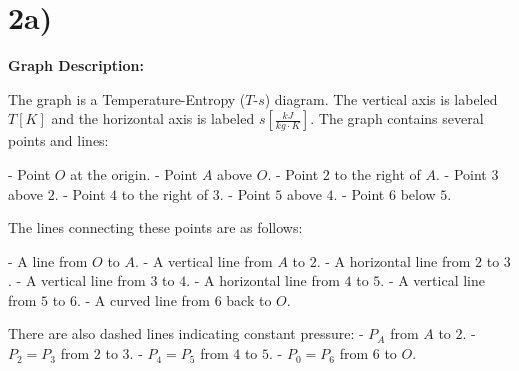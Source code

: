 

\section*{2a)}

\begin{center}
\textbf{Graph Description:}
\end{center}

The graph is a Temperature-Entropy ($T$-$s$) diagram. The vertical axis is labeled $T [K]$ and the horizontal axis is labeled $s \left[ \frac{kJ}{kg \cdot K} \right]$. The graph contains several points and lines:

- Point $O$ at the origin.
- Point $A$ above $O$.
- Point $2$ to the right of $A$.
- Point $3$ above $2$.
- Point $4$ to the right of $3$.
- Point $5$ above $4$.
- Point $6$ below $5$.

The lines connecting these points are as follows:

- A line from $O$ to $A$.
- A vertical line from $A$ to $2$.
- A horizontal line from $2$ to $3$.
- A vertical line from $3$ to $4$.
- A horizontal line from $4$ to $5$.
- A vertical line from $5$ to $6$.
- A curved line from $6$ back to $O$.

There are also dashed lines indicating constant pressure:
- $P_A$ from $A$ to $2$.
- $P_2 = P_3$ from $2$ to $3$.
- $P_4 = P_5$ from $4$ to $5$.
- $P_0 = P_6$ from $6$ to $O$.